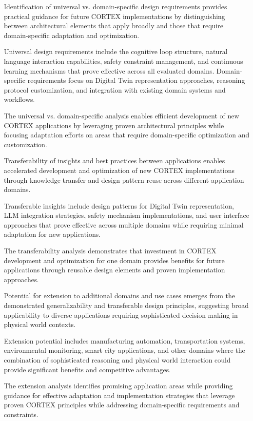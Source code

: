 Identification of universal vs. domain-specific design requirements provides practical guidance for future CORTEX implementations by distinguishing between architectural elements that apply broadly and those that require domain-specific adaptation and optimization.

Universal design requirements include the cognitive loop structure, natural language interaction capabilities, safety constraint management, and continuous learning mechanisms that prove effective across all evaluated domains. Domain-specific requirements focus on Digital Twin representation approaches, reasoning protocol customization, and integration with existing domain systems and workflows.

The universal vs. domain-specific analysis enables efficient development of new CORTEX applications by leveraging proven architectural principles while focusing adaptation efforts on areas that require domain-specific optimization and customization.

Transferability of insights and best practices between applications enables accelerated development and optimization of new CORTEX implementations through knowledge transfer and design pattern reuse across different application domains.

Transferable insights include design patterns for Digital Twin representation, LLM integration strategies, safety mechanism implementations, and user interface approaches that prove effective across multiple domains while requiring minimal adaptation for new applications.

The transferability analysis demonstrates that investment in CORTEX development and optimization for one domain provides benefits for future applications through reusable design elements and proven implementation approaches.

Potential for extension to additional domains and use cases emerges from the demonstrated generalizability and transferable design principles, suggesting broad applicability to diverse applications requiring sophisticated decision-making in physical world contexts.

Extension potential includes manufacturing automation, transportation systems, environmental monitoring, smart city applications, and other domains where the combination of sophisticated reasoning and physical world interaction could provide significant benefits and competitive advantages.

The extension analysis identifies promising application areas while providing guidance for effective adaptation and implementation strategies that leverage proven CORTEX principles while addressing domain-specific requirements and constraints.

